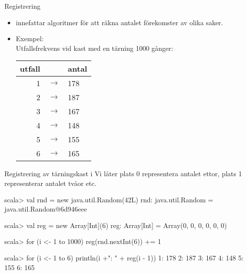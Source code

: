 


\begin{Slide}{Registrering}
\begin{itemize}
\item {} innefattar algoritmer för att räkna antalet förekomster av olika saker.

\item Exempel: 
\\\vspace{0.5em}Utfallsfrekvens vid kast med en tärning 1000 gånger:

\vspace{1em}\begin{tabular}{r c l}
utfall & & antal \\ \hline
1 & $\rightarrow$ & 178 \\
2 & $\rightarrow$ & 187 \\
3 & $\rightarrow$ & 167 \\
4 & $\rightarrow$ & 148 \\
5 & $\rightarrow$ & 155 \\
6 & $\rightarrow$ & 165 \\
\end{tabular}
\end{itemize}
\end{Slide}

\begin{Slide}{Registrering av tärningskast i }
Vi låter plats 0 representera antalet ettor, plats 1 representerar antalet tvåor etc.
\begin{REPLnonum}
scala> val rnd = new java.util.Random(42L)
rnd: java.util.Random = java.util.Random@6d946eee

scala> val reg = new Array[Int](6)
reg: Array[Int] = Array(0, 0, 0, 0, 0, 0)

scala> for (i <- 1 to 1000) reg(rnd.nextInt(6)) += 1

scala> for (i <- 1 to 6) println(i +": " + reg(i - 1))
1: 178
2: 187
3: 167
4: 148
5: 155
6: 165
\end{REPLnonum}
\end{Slide}

